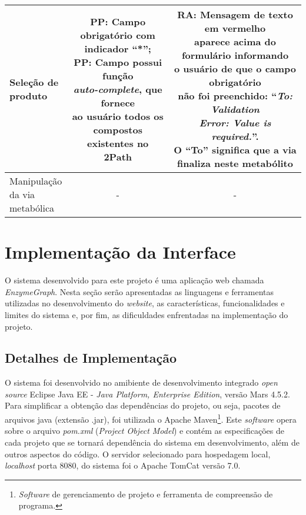 \begin{table}
\begin{tabular}{|l|c|c|}
\specialcell{Seleção de\\produto} & \specialcell{\textbf{PP}: Campo obrigatório com\\indicador ``*'';\\\textbf{PP}: Campo possui função\\\textit{auto-complete}, que fornece\\ao usuário todos os\\compostos existentes no\\2Path} & \specialcell{\textbf{RA}: Mensagem de texto em vermelho \\aparece acima do formulário informando\\o usuário de que o campo obrigatório\\não foi preenchido: ``\textit{To: Validation}\\\textit{Error: Value is required.}''.\\O ``To'' significa que a via\\finaliza neste metabólito} \\ \hline

\specialcell{Manipulação\\da via\\metabólica} & - & - \\ \hline
\end{tabular}
\end{table}


\section{Implementação da Interface}


\indent O sistema desenvolvido para este projeto é uma aplicação web chamada \textit{EnzymeGraph}. Nesta seção serão apresentadas as linguagens e ferramentas utilizadas no desenvolvimento do \textit{website}, as características, funcionalidades e limites do sistema e, por fim, as dificuldades enfrentadas na implementação do projeto.

\subsection{Detalhes de Implementação}

\indent O sistema foi desenvolvido no amibiente de desenvolvimento integrado \textit{open source} Eclipse Java EE - \textit{Java Platform, Enterprise Edition}, versão Mars 4.5.2. Para simplificar a obtenção das dependências do projeto, ou seja, pacotes de arquivos java (extensão .jar), foi utilizada o Apache Maven\footnote{\textit{Software} de gerenciamento de projeto e ferramenta de compreensão de programa.}. Este \textit{software} opera sobre o arquivo \textit{pom.xml} (\textit{Project Object Model}) e contém as especificações de cada projeto que se tornará dependência do sistema em desenvolvimento, além de outros aspectos do código. O servidor selecionado para hospedagem local, \textit{localhost} porta 8080, do sistema foi o Apache TomCat versão 7.0.

